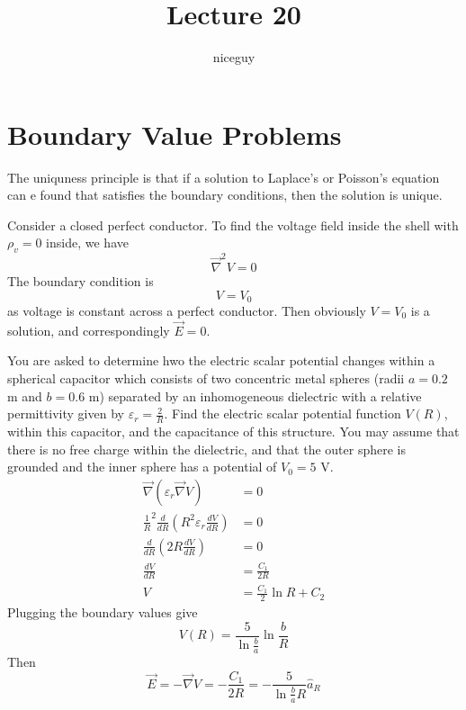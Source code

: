 \documentclass[12pt]{article}
\author{niceguy}
\title{Lecture 20}
\begin{document}
\maketitle

\section{Boundary Value Problems}

The uniquness principle is that if a solution to Laplace's or Poisson's equation can e found that satisfies the boundary conditions, then the solution is unique.

\begin{ex}
	Consider a closed perfect conductor. To find the voltage field inside the shell with $\rho_v = 0$ inside, we have
	$$\vec{\nabla}^2V = 0$$
	The boundary condition is
	$$V=V_0$$
	as voltage is constant across a perfect conductor. Then obviously $V=V_0$ is a solution, and correspondingly $\vec{E} = 0$.
\end{ex}

\begin{ex}
	You are asked to determine hwo the electric scalar potential changes within a spherical capacitor which consists of two concentric metal spheres (radii $a=0.2$ m and $b = 0.6$ m) separated by an inhomogeneous dielectric with a relative permittivity given by $\varepsilon_r = \frac{2}{R}$. Find the electric scalar potential function $V(R)$, within this capacitor, and the capacitance of this structure. You may assume that there is no free charge within the dielectric, and that the outer sphere is grounded and the inner sphere has a potential of $V_0 = 5$ V. \\
	\begin{align*}
		\vec{\nabla}(\varepsilon_r\vec{\nabla}V) &= 0 \\
		\frac{1}{R}^2\frac{d}{dR}\left(R^2\varepsilon_r \frac{dV}{dR}\right) &= 0 \\
		\frac{d}{dR}\left(2R\frac{dV}{dR}\right) &= 0 \\
		\frac{dV}{dR} &= \frac{C_1}{2R} \\
		V &= \frac{C_1}{2}\ln R + C_2
	\end{align*}
	Plugging the boundary values give
	$$V(R) = \frac{5}{\ln\frac{b}{a}}\ln\frac{b}{R}$$
	Then
	$$\vec{E} = -\vec{\nabla}V = -\frac{C_1}{2R} = -\frac{5}{\ln\frac{b}{a}R} \hat{a}_R$$
\end{ex}
\end{document}
